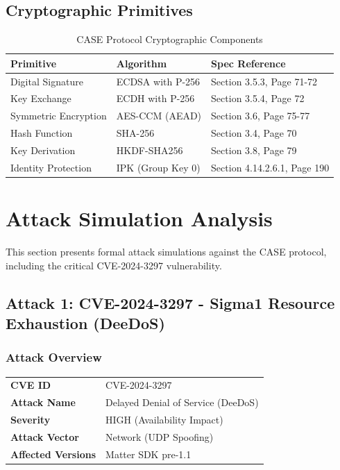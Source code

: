 \documentclass[11pt,a4paper]{article}
\begin{document}
\subsection{Cryptographic Primitives}

\begin{table}[H]
    \centering
    \caption{CASE Protocol Cryptographic Components}
    \begin{tabular}{lll}
        \toprule
        \textbf{Primitive} & \textbf{Algorithm} & \textbf{Spec Reference} \\
        \midrule
        Digital Signature & ECDSA with P-256 & Section 3.5.3, Page 71-72 \\
        Key Exchange & ECDH with P-256 & Section 3.5.4, Page 72 \\
        Symmetric Encryption & AES-CCM (AEAD) & Section 3.6, Page 75-77 \\
        Hash Function & SHA-256 & Section 3.4, Page 70 \\
        Key Derivation & HKDF-SHA256 & Section 3.8, Page 79 \\
        Identity Protection & IPK (Group Key 0) & Section 4.14.2.6.1, Page 190 \\
        \bottomrule
    \end{tabular}
\end{table}

\section{Attack Simulation Analysis}

This section presents formal attack simulations against the CASE protocol, including the critical CVE-2024-3297 vulnerability.

\subsection{Attack 1: CVE-2024-3297 - Sigma1 Resource Exhaustion (DeeDoS)}

\subsubsection{Attack Overview}

\begin{table}[H]
    \centering
    \begin{tabular}{ll}
        \toprule
        \textbf{CVE ID} & CVE-2024-3297 \\
        \textbf{Attack Name} & Delayed Denial of Service (DeeDoS) \\
        \textbf{Severity} & HIGH (Availability Impact) \\
        \textbf{Attack Vector} & Network (UDP Spoofing) \\
        \textbf{Affected Versions} & Matter SDK pre-1.1 \\
        \bottomrule
    \end{tabular}
\end{table}
\end{document}
